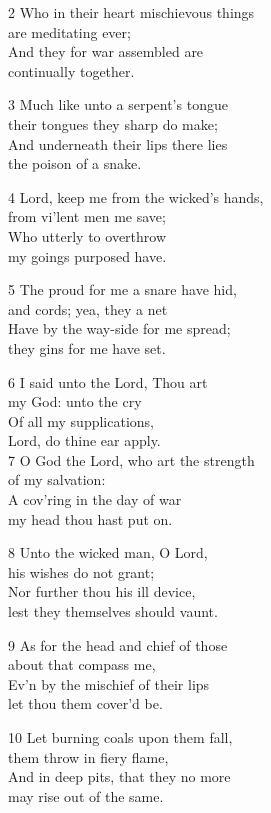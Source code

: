2 Who in their heart mischievous things\\
are meditating ever;\\
And they for war assembled are\\
continually together.

3 Much like unto a serpent’s tongue\\
their tongues they sharp do make;\\
And underneath their lips there lies\\
the poison of a snake.

4 Lord, keep me from the wicked’s hands,\\
from vi’lent men me save;\\
Who utterly to overthrow\\
my goings purposed have.

5 The proud for me a snare have hid,\\
and cords; yea, they a net\\
Have by the way-side for me spread;\\
they gins for me have set.

6 I said unto the Lord, Thou art\\
my God: unto the cry\\
Of all my supplications,\\
Lord, do thine ear apply.\\

7 O God the Lord, who art the strength\\
of my salvation:\\
A cov’ring in the day of war\\
my head thou hast put on.

8 Unto the wicked man, O Lord,\\
his wishes do not grant;\\
Nor further thou his ill device,\\
lest they themselves should vaunt.

9 As for the head and chief of those\\
about that compass me,\\
Ev’n by the mischief of their lips\\
let thou them cover’d be.

10 Let burning coals upon them fall,\\
them throw in fiery flame,\\
And in deep pits, that they no more\\
may rise out of the same.

